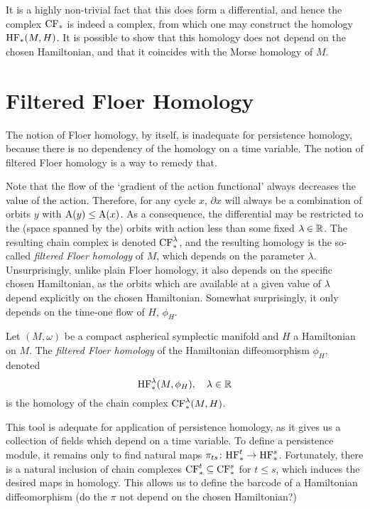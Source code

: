 It is a highly non-trivial fact that this does form a differential, and hence the complex $\CF_*$ is indeed a complex, from which one may construct the homology $\HF_*(M,H)$. It is possible to show that this homology does not depend on the chosen Hamiltonian, and that it coincides with the Morse homology of $M$.

\section{Filtered Floer Homology}

The notion of Floer homology, by itself, is inadequate for persistence homology, because there is no dependency of the homology on a time variable. The notion of filtered Floer homology is a way to remedy that.

Note that the flow of the `gradient of the action functional' always decreases the value of the action. Therefore, for any cycle $x$, $\partial x$ will always be a combination of orbits $y$ with $\AA(y) \leq \AA(x)$. As a consequence, the differential may be restricted to the (space spanned by the) orbits with action less than some fixed $\lambda \in \R$. The resulting chain complex is denoted $\CF_*^\lambda$, and the resulting homology is the so-called \emph{filtered Floer homology} of $M$, which depends on the parameter $\lambda$. Unsurprisingly, unlike plain Floer homology, it also depends on the specific chosen Hamiltonian, as the orbits which are available at a given value of $\lambda$ depend explicitly on the chosen Hamiltonian. Somewhat surprisingly, it only depends on the time-one flow of $H$, $\phi_H$.

\begin{definition}
Let $(M,\omega)$ be a compact aspherical symplectic manifold and $H$ a Hamiltonian on $M$. The \emph{filtered Floer homology} of the Hamiltonian diffeomorphism $\phi_H$, denoted
\begin{equation}
\HF^\lambda_*(M,\phi_H), \quad \lambda \in \R
\end{equation}
is the homology of the chain complex $\CF^\lambda_*(M,H)$.
\end{definition}

This tool is adequate for application of persistence homology, as it gives us a collection of fields which depend on a time variable. To define a persistence module, it remains only to find natural maps $\pi_{ts} \colon \HF^t_* \to \HF^s_*$. Fortunately, there is a natural inclusion of chain complexes $\CF^t_* \subseteq \CF^s_*$ for $t \leq s$, which induces the desired maps in homology. This allows us to define the barcode of a Hamiltonian diffeomorphism (do the $\pi$ not depend on the chosen Hamiltonian?)

